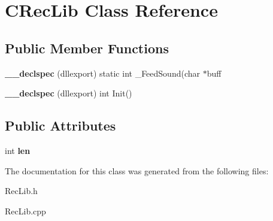 \hypertarget{class_c_rec_lib}{\section{C\-Rec\-Lib Class Reference}
\label{class_c_rec_lib}
}
\subsection*{Public Member Functions}
\begin{DoxyCompactItemize}
\item 
\hypertarget{class_c_rec_lib_ab14844f2c0b89374dde21711f3299f60}{{\bfseries \-\_\-\-\_\-declspec} (dllexport) static int \-\_\-\-Feed\-Sound(char $\ast$buff}\label{class_c_rec_lib_ab14844f2c0b89374dde21711f3299f60}

\item 
\hypertarget{class_c_rec_lib_ae640c513a00525697423e402d0515412}{{\bfseries \-\_\-\-\_\-declspec} (dllexport) int Init()}\label{class_c_rec_lib_ae640c513a00525697423e402d0515412}

\end{DoxyCompactItemize}
\subsection*{Public Attributes}
\begin{DoxyCompactItemize}
\item 
\hypertarget{class_c_rec_lib_a1eb51554a9b94524461330604a867329}{int {\bfseries len}}\label{class_c_rec_lib_a1eb51554a9b94524461330604a867329}

\end{DoxyCompactItemize}


The documentation for this class was generated from the following files\-:\begin{DoxyCompactItemize}
\item 
Rec\-Lib.\-h\item 
Rec\-Lib.\-cpp\end{DoxyCompactItemize}
